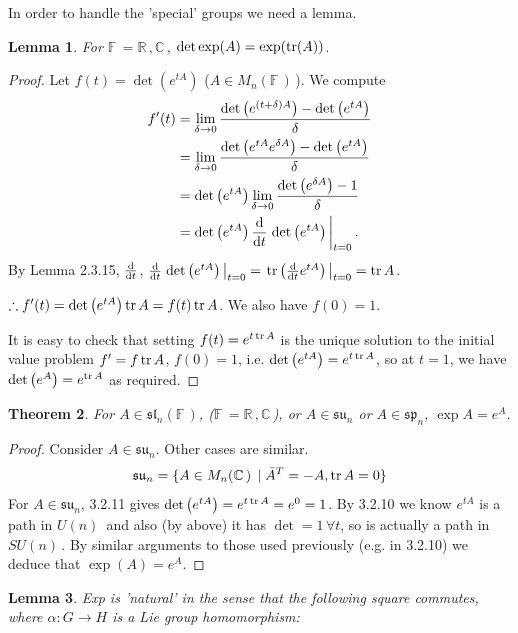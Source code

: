 \documentclass[12pt,a4paper]{article}
\newcommand{\rR}{\ensuremath{\mathbb{R}\,}}
\newcommand{\cC}{\ensuremath{\mathbb{C}\,}}
\newcommand{\fF}{\ensuremath{\mathbb{F}\,}}
\newcommand{\dgq}[2]{\ensuremath{d {#1}_{#2}}}
\newcommand{\mnc}{\ensuremath{M_n(\cC)\,}}
\newcommand{\mnf}{\ensuremath{M_n(\fF)\,}}
\newcommand{\gun}{\ensuremath{U(n)\,}}
\newcommand{\gsun}{\ensuremath{SU(n)\,}}
\newcommand{\lgslnf}{\ensuremath{\mathfrak{sl}_n(\fF)}}
\newcommand{\lgsun}{\ensuremath{\mathfrak{su}_n}}
\newcommand{\lgspn}{\ensuremath{\mathfrak{sp}_n}}
\newcommand{\lalg}{\ensuremath{\mathfrak{g}}}
\newcommand{\lall}[1]{\ensuremath{\mathfrak{#1}}}
\newtheorem{thm}{Theorem}[subsubsection]
\newtheorem{lemma}[thm]{Lemma}
\begin{document}
In order to handle the 'special' groups we need a lemma.
\begin{lemma}
For $\fF=\rR, \cC$, $\det \exp(A)=\exp(\tr(A))$.
\end{lemma}
\begin{proof}
Let $f(t)=\det(e^{tA})$ ($A\in\mnf$). We compute 
\begin{align*}
f'(t)&=\lim_{\delta\to 0}\frac{\det\left(e^{(t+\delta)A}\right)-\det\left(e^{tA}\right)}{\delta}\\
&=\lim_{\delta\to 0}\frac{\det\left(e^{tA}e^{\delta A}\right)-\det\left(e^{tA}\right)}{\delta}\\
&=\det\left(e^{tA}\right)\lim_{\delta\to 0}\frac{\det\left(e^{\delta A}\right)-1}{\delta}\\
&=\det\left(e^{tA}\right)\dv{t}\eval{\det\left(e^{tA}\right)}_{t=0}.
\end{align*}
By Lemma 2.3.15, $\dv{t}$, $\dv{t}\eval{\det\left(e^{tA}\right)}_{t=0}=\eval{\tr\left(\dv{t}e^{tA}\right)}_{t=0}=\tr A$.

$\therefore f'(t)=\det\left(e^{tA}\right)\tr A=f(t)\tr A$. We also have $f(0)=1$.

It is easy to check that setting $f(t)=e^{t\tr A}$ is the unique solution to the initial value problem $f'=f \tr A$, $f(0)=1$, i.e. $\det\left(e^{t A}\right)=e^{t\tr A}$, so at $t=1$, we have $\det\left(e^A\right)=e^{\tr A}$ as required.
\end{proof}
\begin{thm}
For $A\in \lgslnf$, ($\fF=\rR, \cC$), or $A\in \lgsun$ or $A\in \lgspn$, $\exp A=e^A$.
\end{thm}
\begin{proof}
Consider $A\in \lgsun$. Other cases are similar.
\[\lgsun=\{A\in \mnc \mid \bar{A}^T=-A, \tr A=0\}\]
For $A\in \lgsun$, 3.2.11 gives $\det\left(e^{tA}\right)=e^{t\tr A}=e^0=1$. By 3.2.10 we know $e^{tA}$ is a path in $\gun$ and also (by above) it has $\det=1\,\forall t$, so is actually a path in \gsun. By similar arguments to those used previously (e.g. in 3.2.10) we deduce that $\exp(A)=e^A$. 
\end{proof}
\begin{lemma}
Exp is 'natural' in the sense that the following square commutes, where $\alpha:G\to H$ is a Lie group homomorphism:
\begin{center}
\end{center}
\end{lemma}
\end{document}

